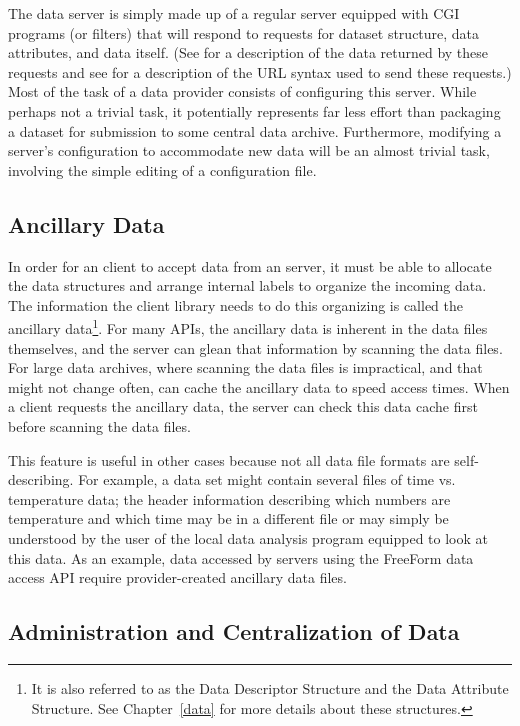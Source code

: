 The \opendap data server is simply made up of a regular  server
equipped with CGI programs (or filters) that will respond to requests
for dataset structure, data attributes, and data itself. (See
 for a description of the data returned by these
requests and see  for a description of the
\opendap URL syntax used to send these requests.)  Most of the task of a
data provider consists of configuring this server.  While perhaps not
a trivial task, it potentially represents far less effort than
packaging a dataset for submission to some central data archive.
Furthermore, modifying a server's configuration to accommodate new
data will be an almost trivial task, involving the simple editing of a
configuration file.

\subsection{Ancillary Data}
\label{intro,ancillary}

In order for an \opendap client to accept data from an \opendap server, it must be able
to allocate the data structures and arrange internal labels to organize the
incoming data.  The information the client library needs to do this
organizing is called the ancillary data\footnote{It is also referred to as
  the Data Descriptor Structure and the Data Attribute Structure.  See
  Chapter~\ref{data} for more details about these structures.}.  For many
APIs, the ancillary data is inherent in the data files themselves, and the
\opendap server can glean that information by scanning the data files.  For large
data archives, where scanning the data files is impractical, and that might
not change often, \opendap can cache the ancillary data to speed access times.
When a client requests the ancillary data, the \opendap server can check this
data cache first before scanning the data files.

This feature is useful in other cases because not all data file formats
are self-describing.  For example, a data set might contain several files of 
time vs. temperature data; the header information describing which numbers
are temperature and which time may be in a different file or may simply
be understood by the user of the local data analysis program equipped
to look at this data.  As an example, data accessed by \opendap servers using
the FreeForm data access API require provider-created ancillary data files.

\subsection{Administration and Centralization of Data}
\label{intro,admin}

